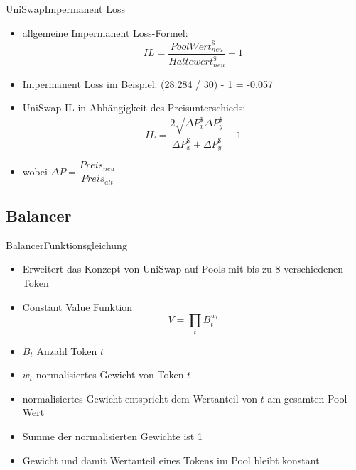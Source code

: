 \documentclass{beamer}
\begin{document}
\begin{frame}{UniSwap}{Impermanent Loss}
 \begin{itemize}
    \item<1->{allgemeine Impermanent Loss-Formel: 
    \begin{equation*}
    IL = \dfrac{Pool Wert^{\$}_{neu}}{Haltewert^{\$}_{neu}}-1
    \end{equation*}
     }
    \item<2->{Impermanent Loss im Beispiel: (28.284 / 30) - 1 = -0.057}
    \item<3->{UniSwap IL in Abhängigkeit des Preisunterschieds:
    \begin{equation*}
    IL =\dfrac{2 \sqrt{\Delta P^{\$}_{x} \Delta P^{\$}_{y}}}{\Delta P^{\$}_{x}+\Delta P^{\$}_{y}}-1 
    \end{equation*}
     }
   \item<3->{wobei $\Delta P = \dfrac{Preis_{neu}}{Preis_{alt}}$}  
   \end{itemize}	
\end{frame}


\subsection{Balancer}

\begin{frame}{Balancer}{Funktionsgleichung}
\begin{itemize}
  \item<1->{Erweitert das Konzept von UniSwap auf Pools mit bis zu 8 verschiedenen Token}
  \item<1->{Constant Value Funktion
  \begin{equation}
  V = \prod_t B^{w_{t}}_{t}
  \end{equation}
  }
  \item<1->{$B_{t}$ Anzahl Token $t$}
  \item<1->{$w_{t}$ normalisiertes Gewicht von Token $t$}
  \item<2->{normalisiertes Gewicht entspricht dem Wertanteil von $t$ am gesamten Pool-Wert}
  \item<2->{Summe der normalisierten Gewichte ist 1}
  \item<2->{Gewicht und damit Wertanteil eines Tokens im Pool bleibt konstant}
\end{itemize}  
\end{frame}
\end{document}
